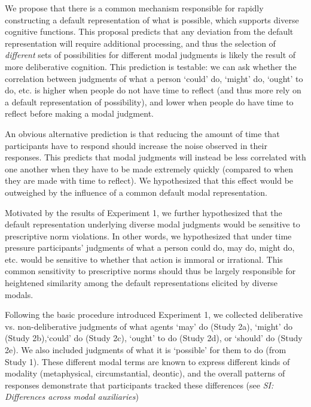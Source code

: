 \documentclass[9pt,twocolumn,twoside]{pnas-new}
\begin{document}
We propose that there is a common mechanism responsible for rapidly constructing a default representation of what is possible, which supports diverse cognitive functions. This proposal predicts that any deviation from the default representation will require additional processing, and thus the selection of \textit{different} sets of possibilities for different modal judgments is likely the result of more deliberative cognition. This prediction is testable: we can ask whether the correlation between judgments of what a person `could' do, `might' do, `ought' to do, etc. is higher when people do not have time to reflect (and thus more rely on a default representation of possibility), and lower when people do have time to reflect before making a modal judgment.

An obvious alternative prediction is that reducing the amount of time that participants have to respond should increase the noise observed in their responses. This predicts that modal judgments will instead be less correlated with one another when they have to be made extremely quickly (compared to when they are made with time to reflect). We hypothesized that this effect would be outweighed by the influence of a common default modal representation.

Motivated by the results of Experiment 1, we further hypothesized that the default representation underlying diverse modal judgments would be sensitive to prescriptive norm violations. In other words, we hypothesized that under time pressure participants' judgments of what a person could do, may do, might do, etc. would be sensitive to whether that action is immoral or irrational.  This common sensitivity to prescriptive norms should thus be largely responsible for heightened similarity among the default representations elicited by diverse modals.

Following the basic procedure introduced Experiment 1, we collected deliberative vs. non-deliberative judgments of what agents `may' do (Study 2a), `might' do (Study 2b),`could' do (Study 2c), `ought' to do (Study 2d), or `should' do (Study 2e). We also included judgments of what it is `possible' for them to do (from Study 1). These different modal terms are known to express different kinds of modality (metaphysical, circumstantial, deontic), and the overall patterns of responses demonstrate that participants tracked these differences (see \textit{SI: Differences across modal auxiliaries})
\end{document}
